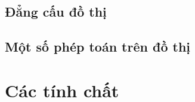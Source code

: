 \section{Đẳng cấu đồ thị}


\section{Một số phép toán trên đồ thị}
\label{sec:mot_so_phep_toan_tren_do_thi}


\chapter{Các tính chất}
\label{sec:mot_so_dinh_ly_menh_de}




